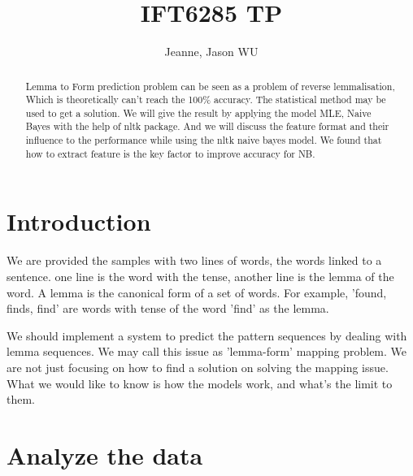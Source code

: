 \documentclass[a4paper]{article}
\title{IFT6285 TP}
\author{Jeanne, Jason WU}
\begin{document}
\maketitle

\begin{abstract}
Lemma to Form prediction problem can be seen as a problem of reverse lemmalisation, Which is theoretically can't reach the 100\% accuracy. The statistical method may be used to get a solution. We will give the result by applying the model MLE, Naive Bayes with the help of nltk package. And we will discuss the feature format and their influence to the performance while using the nltk naive bayes model. We found that how to extract feature is the key factor to improve accuracy for NB.
\end{abstract}

\section{Introduction}
We are provided the samples with two lines of words, the words linked to a sentence. one line is the word with the tense, another line is the lemma of the word. A lemma is the canonical form of a set of words. For example, 'found, finds, find' are words with tense of the word 'find' as the lemma.

We should implement a system to predict the pattern sequences by dealing with lemma sequences. We may call this issue as 'lemma-form' mapping problem. We are not just focusing on how to find a solution on solving the mapping issue. What we would like to know is how the models work, and what's the limit to them.  

\section{Analyze the data}
\end{document}
